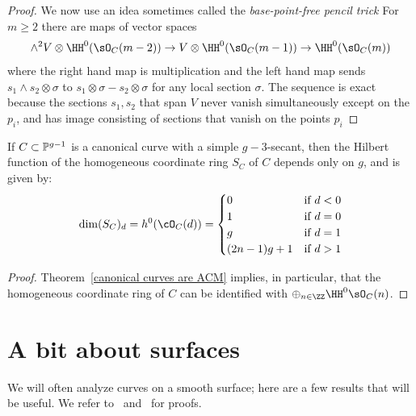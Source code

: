 \begin{proof}
We now use an idea sometimes called the \emph{base-point-free pencil trick}
For $m\geq 2$ there are maps of vector spaces
$$
\wedge^{2} V\otimes \HH^{0}(\sO_{C}(m-2)) \to V\otimes \HH^{0}(\sO_{C}(m-1)) 
\to \HH^{0}(\sO_{C}(m))
$$
where the right hand map is multiplication and the left hand map sends
$s_{1}\wedge s_{2}\otimes \sigma$ to $s_{1}\otimes \sigma-s_{2}\otimes \sigma$ for any local section $\sigma$.
The sequence is exact because the sections $s_{1},s_{2}$ that span $V$ never vanish simultaneously except on the $p_{i}$, and has image  consisting of sections that vanish on the points $p_{i}$
\end{proof}

\begin{corollary}\label{canonical hilbert function}
If $C\subset \PP^{g-1}$ is a canonical curve with a simple $g-3$-secant, then the Hilbert function of the homogeneous coordinate ring $S_{C}$ of  $C$ depends only on $g$, and is given by:
$$
\dim({S_{C}})_{d} = h^{0}(\cO_{C}(d)) = 
\begin{cases}
 0 &\mbox {if } d<0\\
 1 & \mbox {if }  d=0\\
 g & \mbox {if }  d=1\\
 (2n-1)g+1 & \mbox {if }  d>1\\
\end{cases}
$$
\end{corollary}
\begin{proof}
Theorem~\ref{canonical curves are ACM} implies, in particular, that the homogeneous coordinate ring of $C$ can be identified with 
$\oplus_{n\in \ZZ}\HH^0\sO_C(n)$.  
\end{proof}

 \section{A bit about surfaces}
 We will often analyze curves  on a smooth surface; here are a few results that will be useful. We refer to~\cite[Chapter V]{Hartshorne1977}
 and~\cite[Chapter I]{Beauville} for proofs.
 
